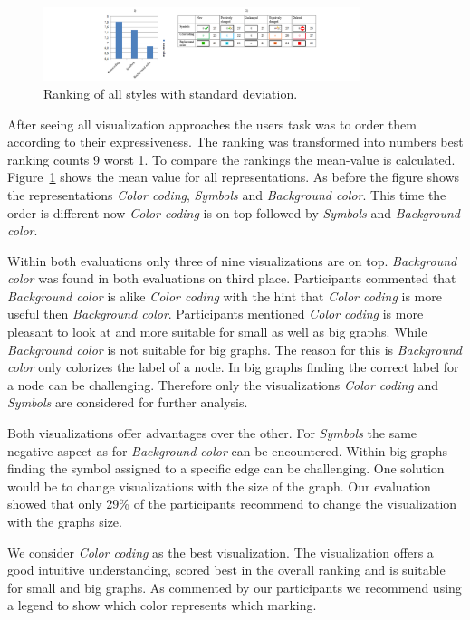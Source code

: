 \documentclass{llncs}
\begin{document}
\begin{keywords}
\begin{figure}
	\centering
	\includegraphics[width=350px]{Images/Results.PNG}
	\caption{Ranking of all styles with standard deviation.}
	\label{fig:SurveyResults}
\end{figure}



After seeing all visualization approaches the users task was to order them according to their expressiveness. The ranking was transformed into numbers best ranking counts 9 worst 1. To compare the rankings the mean-value is calculated. Figure~\ref{fig:SurveyResults} shows the mean value for all representations. As before the figure shows the representations \emph{Color coding}, \emph{Symbols} and \emph{Background color}. This time the order is different now \emph{Color coding} is on top followed by \emph{Symbols} and \emph{Background color}.


Within both evaluations only three of nine visualizations are on top. \emph{Background color} was found in both evaluations on third place. Participants commented that \emph{Background color} is alike \emph{Color coding} with the hint that \emph{Color coding} is more useful then \emph{Background color}. Participants mentioned \emph{Color coding} is more pleasant to look at and more suitable for small as well as big graphs. While \emph{Background color} is not suitable for big graphs. The reason for this is \emph{Background color} only colorizes the label of a node. In big graphs finding the correct label for a node can be challenging. Therefore only the visualizations \emph{Color coding} and \emph{Symbols} are considered for further analysis.

Both visualizations offer advantages over the other. For \emph{Symbols} the same negative aspect as for \emph{Background color} can be encountered. Within big graphs finding the symbol assigned to a specific edge can be challenging. One solution would be to change visualizations with the size of the graph. Our evaluation showed that only 29\% of the participants recommend to change the visualization with the graphs size.

We consider \emph{Color coding} as the best visualization. The visualization offers a good intuitive understanding, scored best in the overall ranking and is suitable for small and big graphs. As commented by our participants we recommend using a legend to show which color represents which marking.


\end{keywords}
\end{document}
